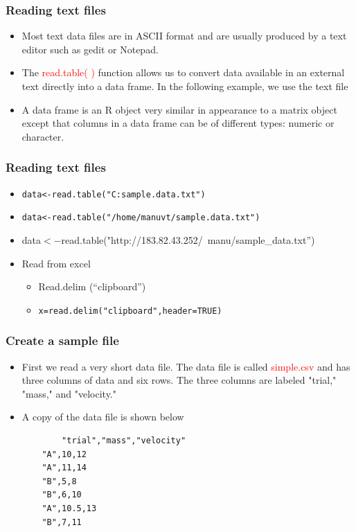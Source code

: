 \documentclass[12pt]{beamer}
\begin{document}
\begin{frame}
\frametitle{Reading text files}
\begin{itemize}\justifying
	\item Most text data files are in ASCII format and are usually
	produced by a text editor such as gedit or Notepad.
	\item  The \textcolor{red}{read.table( )} function allows us to convert data
	available in an external text directly into a data frame.
	In the following example, we use the text file
	\item  A data frame is an R object very similar in appearance
	to a matrix object except that columns in a data frame
	can be of different types: numeric or character.
\end{itemize}
\end{frame}

\begin{frame}[fragile]
\frametitle{Reading text files}
\begin{itemize}\justifying
	\item \verb|data<-read.table("C:sample.data.txt")|
	\item \verb|data<-read.table("/home/manuvt/sample.data.txt")|
	\item data$<-$read.table("http://183.82.43.252/~manu/sample\_data.txt”)
	\item Read from excel 
	\begin{itemize}
		\item Read.delim (``clipboard”)
		\item \verb|x=read.delim("clipboard",header=TRUE)|
	\end{itemize}
\end{itemize}
\end{frame}

\begin{frame}[fragile]
\frametitle{Create a sample file}
\begin{itemize}\justifying
	\item First we read a very short data file. The data file is
	called \textcolor{red}{simple.csv} and has three columns of data and six
	rows. The three columns are labeled "trial," "mass," and
	"velocity."
	\item A copy of the data file is shown below
	\begin{verbatim}
		"trial","mass","velocity"
	"A",10,12
	"A",11,14
	"B",5,8
	"B",6,10
	"A",10.5,13
	"B",7,11
	\end{verbatim}
\end{itemize}
\end{frame}
\end{document}

